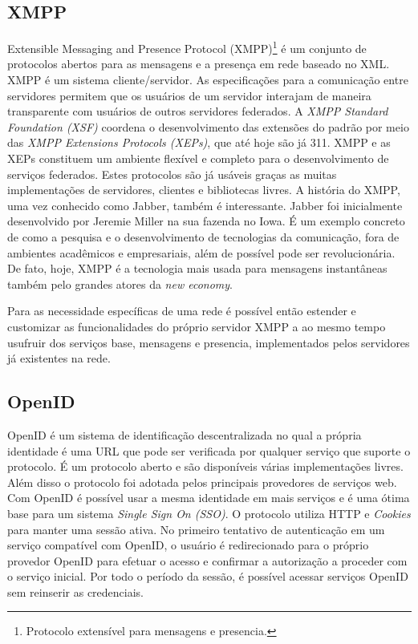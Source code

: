 \subsection{XMPP}
Extensible Messaging and Presence Protocol (XMPP)\footnote{Protocolo
  extensível para mensagens e presencia.} é um conjunto de protocolos
abertos para as mensagens e a presença em rede baseado no XML. XMPP é
um sistema cliente/servidor. As especificações para a comunicação
entre servidores permitem que os usuários de um servidor interajam de
maneira transparente com usuários de outros servidores federados. A
\emph{XMPP Standard Foundation (XSF)} coordena o desenvolvimento das
extensões do padrão por meio das \emph{XMPP Extensions Protocols
  (XEPs)}, que até hoje são já 311. XMPP e as XEPs constituem um
ambiente flexível e completo para o desenvolvimento de serviços
federados. Estes protocolos são já usáveis graças as muitas
implementações de servidores, clientes e bibliotecas livres. A
história do XMPP, uma vez conhecido como Jabber, também é
interessante. Jabber foi inicialmente desenvolvido por Jeremie Miller
na sua fazenda no Iowa. É um exemplo concreto de como a pesquisa e o
desenvolvimento de tecnologias da comunicação, fora de ambientes
acadêmicos e empresariais, além de possível pode ser
revolucionária. De fato, hoje, XMPP é a tecnologia mais usada para
mensagens instantâneas também pelo grandes atores da \emph{new
  economy}.

Para as necessidade específicas de uma rede é possível então estender
e customizar as funcionalidades do próprio servidor XMPP a ao mesmo
tempo usufruir dos serviços base, mensagens e presencia, implementados
pelos servidores já existentes na rede. 

\subsection{OpenID}
OpenID é um sistema de identificação descentralizada no qual a própria
identidade é uma URL que pode ser verificada por qualquer serviço que
suporte o protocolo. É um protocolo aberto e são disponíveis várias
implementações livres. Além disso o protocolo foi adotada pelos
principais provedores de serviços web. Com OpenID é possível usar a
mesma identidade em mais serviços e é uma ótima base para um sistema
\emph{Single Sign On (SSO)}. O protocolo utiliza HTTP e \emph{Cookies}
para manter uma sessão ativa. No primeiro tentativo de autenticação em
um serviço compatível com OpenID, o usuário é redirecionado para o
próprio provedor OpenID para efetuar o acesso e confirmar a
autorização a proceder com o serviço inicial. Por todo o período da
sessão, é possível acessar serviços OpenID sem reinserir as
credenciais.

